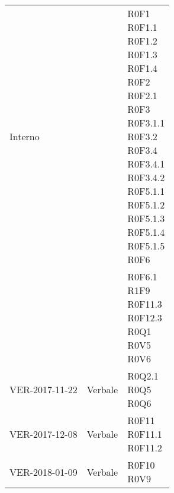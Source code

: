 \documentclass[AnalisiDeiRequisiti.tex]{subfiles}
\begin{document}
\begin{longtable}[H]{p{2cm}p{5cm}p{5cm}}
	\rowcolor{CRighePari}
	Interno & &  \makecell[tl]{ R0F1 \\
	 R0F1.1 \\
	 R0F1.2 \\
	 R0F1.3 \\
	 R0F1.4 \\
	 R0F2 \\
	 R0F2.1 \\
	 R0F3 \\
	 R0F3.1.1 \\
	 R0F3.2 \\
	 R0F3.4 \\
	 R0F3.4.1 \\
	 R0F3.4.2 \\
	 R0F5.1.1 \\
	 R0F5.1.2 \\
	 R0F5.1.3 \\
	 R0F5.1.4 \\
	 R0F5.1.5 \\
	 R0F6
	 } \\
	& & \makecell[tl]{
	 R0F6.1 \\
	 R1F9 \\
	 R0F11.3 \\
	 R0F12.3 \\
	 R0Q1 \\
	 R0V5 \\
	 R0V6 } \\  
	
	VER-2017-11-22 & Verbale &  \makecell[tl]{ R0Q2.1 \\
	 R0Q5 \\
	 R0Q6 } \\  
	
	VER-2017-12-08 & Verbale & \makecell[tl]{ R0F11 \\
	 R0F11.1 \\
	 R0F11.2 } \\  
	VER-2018-01-09 & Verbale & \makecell[tl]{ R0F10 \\
	R0V9 } \\ 
	

\end{longtable}
\end{document}
